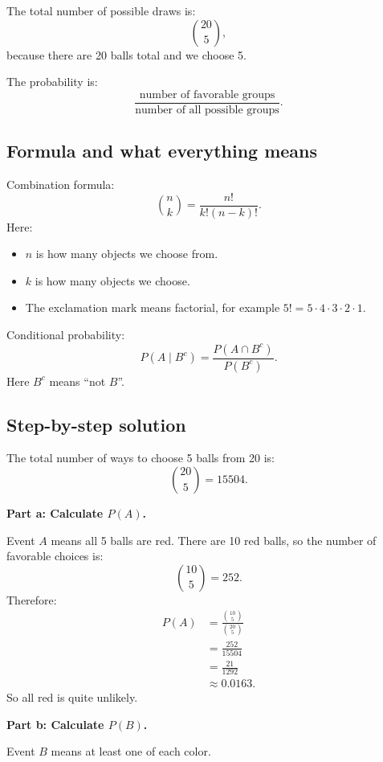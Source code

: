 \documentclass[11pt,a4paper]{article}
\begin{document}
The total number of possible draws is:
\[
\binom{20}{5},
\]
because there are 20 balls total and we choose 5.

The probability is:
\[
\frac{\text{number of favorable groups}}{\text{number of all possible groups}}.
\]

\subsection*{Formula and what everything means}
Combination formula:
\[
\binom{n}{k}=\frac{n!}{k!(n-k)!}.
\]
Here:
\begin{itemize}[leftmargin=*]
    \item \(n\) is how many objects we choose from.
    \item \(k\) is how many objects we choose.
    \item The exclamation mark means factorial, for example \(5!=5\cdot4\cdot3\cdot2\cdot1\).
\end{itemize}

Conditional probability:
\[
P(A\mid B^c)=\frac{P(A\cap B^c)}{P(B^c)}.
\]
Here \(B^c\) means ``not \(B\)''.

\subsection*{Step-by-step solution}
The total number of ways to choose 5 balls from 20 is:
\[
\binom{20}{5}=15504.
\]

\textbf{Part a: Calculate \(P(A)\).}

Event \(A\) means all 5 balls are red. There are 10 red balls, so the number of favorable choices is:
\[
\binom{10}{5}=252.
\]
Therefore:
\begin{align*}
P(A)
&=\frac{\binom{10}{5}}{\binom{20}{5}}\\
&=\frac{252}{15504}\\
&=\frac{21}{1292}\\
&\approx 0.0163.
\end{align*}
So all red is quite unlikely.

\textbf{Part b: Calculate \(P(B)\).}

Event \(B\) means at least one of each color.
\end{document}
